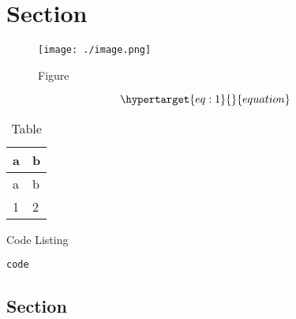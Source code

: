 \hypertarget{section}{%
\section{Section}\label{section}}

\begin{figure}
\hypertarget{fig:1}{%
\centering
\texttt{[image: ./image.png]}
\caption{Figure}\label{fig:1}
}
\end{figure}

\begin{equation}\protect\hypertarget{eq:1}{}{equation}\label{eq:1}\end{equation}

\hypertarget{tbl:1}{}
\begin{longtable}[]{@{}ll@{}}
\caption{\label{tbl:1}Table}\tabularnewline
\toprule()
a & b \\
\midrule()
\endfirsthead
\toprule()
a & b \\
\midrule()
\endhead
1 & 2 \\
\bottomrule()
\end{longtable}

\begin{codelisting}

\caption{Code Listing}

\hypertarget{lst:1}{%
\label{lst:1}}%
\begin{verbatim}
code
\end{verbatim}

\end{codelisting}

\hypertarget{section-1}{%
\subsection{Section}\label{section-1}}
